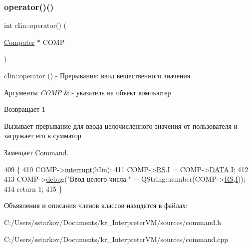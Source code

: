 \subsubsection{\texorpdfstring{operator()()}{operator()()}}
{\footnotesize\ttfamily int c\+Iin\+::operator() (\begin{DoxyParamCaption}\item[{\hyperlink{class_computer}{Computer} $\ast$}]{C\+O\+MP }\end{DoxyParamCaption})\hspace{0.3cm}{\ttfamily [virtual]}}



c\+Iin\+::operator () -\/ Прерывание\+: ввод вещественного значения 


\begin{DoxyParams}{Аргументы}
{\em C\+O\+MP} & -\/ указатель на объект компьютер \\
\hline
\end{DoxyParams}
\begin{DoxyReturn}{Возвращает}
1
\end{DoxyReturn}
Вызывает прерывание для ввода целочисленного значения от пользователя и загружает его в сумматор 

Замещает \hyperlink{class_command_a79939b66f3de892e91d7710844294716}{Command}.


\begin{DoxyCode}
409 \{
410     COMP->\hyperlink{class_computer_aa57b0ed2f3a9b168c2924174ec524bd4}{interrupt}(hIin);
411     COMP->\hyperlink{class_computer_a874503110664b3cf821118d2ce9c2b96}{RS}.\hyperlink{union_computer_1_1data_a6e51de6e0351adc4e50b336a092bc4bb}{I} = COMP->\hyperlink{class_computer_adb154047da2156e4419af3b3a4a766b7}{DATA}.\hyperlink{union_computer_1_1data_a6e51de6e0351adc4e50b336a092bc4bb}{I};
412 
413     COMP->\hyperlink{class_computer_a10ca6c6b200630119201de16d7368e0f}{debug}(\textcolor{stringliteral}{"Ввод целого числа "} + QString::number(COMP->\hyperlink{class_computer_a874503110664b3cf821118d2ce9c2b96}{RS}.\hyperlink{union_computer_1_1data_a6e51de6e0351adc4e50b336a092bc4bb}{I}));
414     \textcolor{keywordflow}{return} 1;
415 \}
\end{DoxyCode}


Объявления и описания членов классов находятся в файлах\+:\begin{DoxyCompactItemize}
\item 
C\+:/\+Users/sstarkov/\+Documents/kr\+\_\+\+Interpreter\+V\+M/sources/command.\+h\item 
C\+:/\+Users/sstarkov/\+Documents/kr\+\_\+\+Interpreter\+V\+M/sources/command.\+cpp\end{DoxyCompactItemize}
